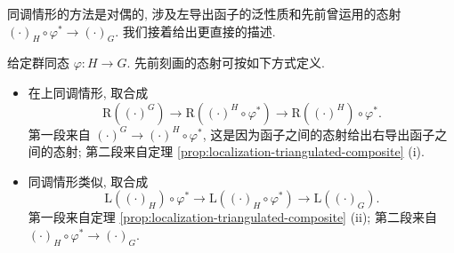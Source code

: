 同调情形的方法是对偶的, 涉及左导出函子的泛性质和先前曾运用的态射 $(\cdot)_H \circ \varphi^* \to (\cdot)_G$. 我们接着给出更直接的描述.

\begin{lemma}\label{prop:change-of-groups-alt}
	给定群同态 $\varphi: H \to G$. 先前刻画的态射可按如下方式定义.
	\begin{itemize}
		\item 在上同调情形, 取合成
		\begin{equation}\label{eqn:change-of-group-dec-1}
			\mathrm{R}\left( (\cdot)^G \right) \to \mathrm{R}\left( (\cdot)^H \circ \varphi^* \right) \to \mathrm{R}\left( (\cdot)^H \right) \circ \varphi^* .
		\end{equation}
		第一段来自 $(\cdot)^G \to (\cdot)^H \circ \varphi^*$, 这是因为函子之间的态射给出右导出函子之间的态射; 第二段来自定理 \ref{prop:localization-triangulated-composite} (i).
		\item 同调情形类似, 取合成
		\begin{equation}\label{eqn:change-of-group-dec-2}
			\mathrm{L}\left( (\cdot)_H \right) \circ \varphi^* \to \mathrm{L} \left( (\cdot)_H \circ \varphi^* \right) \to \mathrm{L}\left( (\cdot)_G \right).
		\end{equation}
		第一段来自定理 \ref{prop:localization-triangulated-composite} (ii); 第二段来自 $(\cdot)_H \circ \varphi^* \to (\cdot)_G$.
	\end{itemize}
\end{lemma}
